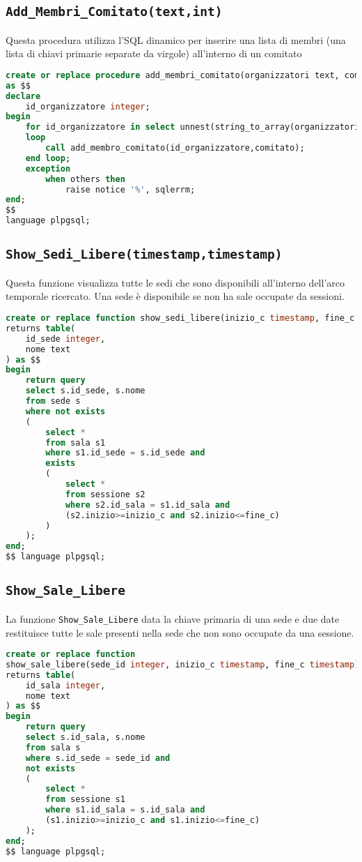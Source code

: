 \subsection{\texttt{Add\_Membri\_Comitato(text,int)}}
Questa procedura utilizza l'SQL dinamico per inserire una lista di membri (una lista di chiavi primarie separate da virgole) all'interno di un comitato
\begin{lstlisting}[language=SQL,style=mystyle]
create or replace procedure add_membri_comitato(organizzatori text, comitato integer)
as $$
declare
    id_organizzatore integer;
begin
    for id_organizzatore in select unnest(string_to_array(organizzatori,','))::integer
    loop
        call add_membro_comitato(id_organizzatore,comitato);
    end loop;
    exception
        when others then
            raise notice '%', sqlerrm;
end;
$$
language plpgsql;


\end{lstlisting}
\subsection{\texttt{Show\_Sedi\_Libere(timestamp,timestamp)}}
Questa funzione visualizza tutte le sedi che sono disponibili all'interno dell'arco temporale ricercato. Una sede è disponibile se non ha sale occupate da sessioni.
\begin{lstlisting}[language=SQL,style=mystyle]
create or replace function show_sedi_libere(inizio_c timestamp, fine_c timestamp)
returns table(
    id_sede integer,
    nome text
) as $$
begin
    return query
    select s.id_sede, s.nome
    from sede s
    where not exists
    (
        select *
        from sala s1
        where s1.id_sede = s.id_sede and
        exists
        (
            select *
            from sessione s2
            where s2.id_sala = s1.id_sala and
            (s2.inizio>=inizio_c and s2.inizio<=fine_c)
        )
    );
end;
$$ language plpgsql;
\end{lstlisting}
\subsection{\texttt{Show\_Sale\_Libere}}
La funzione \texttt{Show\_Sale\_Libere} data la chiave primaria di una sede e due date restituisce tutte le sale presenti nella sede che non sono occupate da una sessione.
\begin{lstlisting}[language=SQL,style=mystyle]
create or replace function 
show_sale_libere(sede_id integer, inizio_c timestamp, fine_c timestamp)
returns table(
    id_sala integer,
    nome text
) as $$
begin
    return query
    select s.id_sala, s.nome
    from sala s
    where s.id_sede = sede_id and
    not exists
    (
        select *
        from sessione s1
        where s1.id_sala = s.id_sala and
        (s1.inizio>=inizio_c and s1.inizio<=fine_c)
    );
end;
$$ language plpgsql;
\end{lstlisting}
